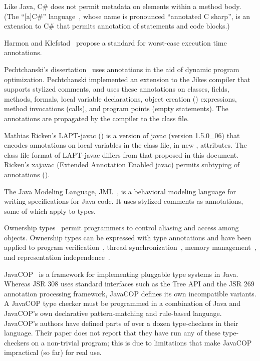 \documentclass[10pt]{article}
\begin{document}
Like Java, C\# does not permit
metadata on elements within a method body.
(The ``[a]C\#'' language~\cite{CazzolaCC2005:JOT}, whose name is pronounced
``annotated C sharp'', is an extension to C\# that permits annotation of
statements and code blocks.)

Harmon and Klefstad~\cite{HarmonK2007} propose a standard for worst-case
execution time annotations.


Pechtchanski's dissertation~\cite{Pechtchanski2003} uses annotations in the
aid of dynamic program optimization.  Pechtchanski implemented an extension
to the Jikes compiler that supports stylized comments, and uses these
annotations on classes, fields, methods, formals, local variable
declarations, object creation () expressions, method invocations
(calls), and program points (empty statements).  The annotations are
propagated by the compiler to the class file.


Mathias Ricken's LAPT-javac
() is a version
of javac (version 1.5.0\_06) that
encodes annotations on local variables in the class file, in new
, attributes.
The class file format of LAPT-javac differs from that proposed in this
document.
Ricken's xajavac (Extended Annotation Enabled
javac) permits subtyping of annotations ().


The Java Modeling Language, JML~\cite{LeavensBR2006:JML}, is a behavioral
modeling language for writing specifications for Java code.  It uses
stylized comments as annotations, some of which apply to types.


Ownership types~\cite{ClarkePN98,Boyapati2004:PhD,Clark2001,ClarkD2002,PotaninNCB2006,NobleVP98,DietlM2005,LeinoM2004,YuP2006}
permit programmers to control aliasing and access among objects.  Ownership
types can be expressed with type annotations
and have been applied to program
verification~\cite{LeinoM2004,Muller2002,MullerPHL2006}, thread
synchronization~\cite{BoyapatiLR2002,JacobsPLS2005}, memory
management~\cite{AndreaCGNVZ2006,BoyapatiSBR2003}, and representation
independence~\cite{BanerjeeN2002}.


JavaCOP~\cite{AndreaeNMM2006} is a framework for implementing pluggable
type systems in Java.  Whereas JSR 308 uses standard
interfaces such as the Tree API and the JSR 269 annotation processing
framework, JavaCOP defines its own incompatible variants.
A JavaCOP type checker must be programmed in a combination of Java and
JavaCOP's own declarative pattern-matching and rule-based language.
JavaCOP's authors have defined parts of over a dozen
type-checkers in their language.  Their paper does not report that they have
run any of these type-checkers on a non-trivial program; this is due to
limitations that make JavaCOP impractical (so far) for real use.
\end{document}
